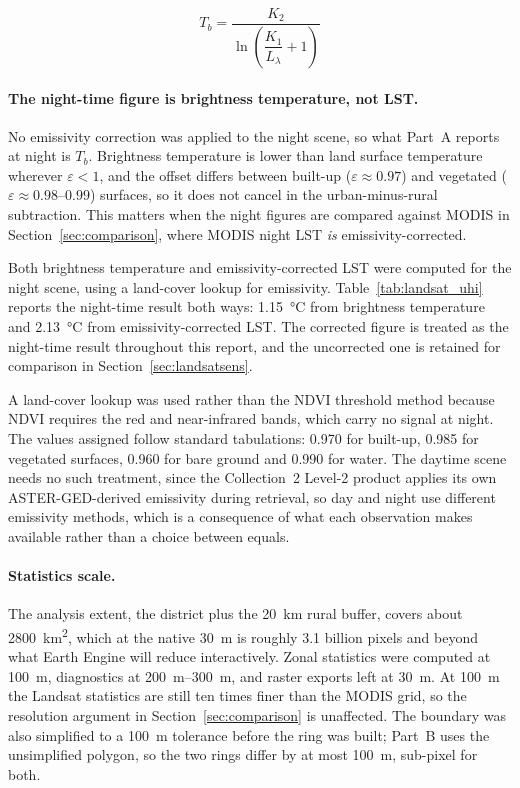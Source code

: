 \documentclass[11pt,a4paper]{article}
\begin{document}
\begin{equation}
  T_b = \frac{K_2}{\ln\!\left(\dfrac{K_1}{L_\lambda} + 1\right)}
\end{equation}

\paragraph{The night-time figure is brightness temperature, not LST.}
No emissivity correction was applied to the night scene, so what
Part~A reports at night is $T_b$. Brightness temperature is lower than
land surface temperature wherever $\varepsilon < 1$, and the offset
differs between built-up ($\varepsilon \approx 0.97$) and vegetated
($\varepsilon \approx 0.98$--$0.99$) surfaces, so it does not cancel
in the urban-minus-rural subtraction. This matters when the night
figures are compared against MODIS in Section~\ref{sec:comparison},
where MODIS night LST \emph{is} emissivity-corrected.

Both brightness temperature and emissivity-corrected LST were
computed for the night scene, using a land-cover lookup for
emissivity. Table~\ref{tab:landsat_uhi} reports the night-time result
both ways: \SI{1.15}{\degreeCelsius} from brightness temperature and
\SI{2.13}{\degreeCelsius} from emissivity-corrected LST. The corrected
figure is treated as the night-time result throughout this report, and
the uncorrected one is retained for comparison in
Section~\ref{sec:landsatsens}.

A land-cover lookup was used rather than the NDVI threshold method
because NDVI requires the red and near-infrared bands, which carry no
signal at night. The values assigned follow standard tabulations:
\num{0.970} for built-up, \num{0.985} for vegetated surfaces,
\num{0.960} for bare ground and \num{0.990} for water. The daytime
scene needs no such treatment, since the Collection~2 Level-2 product
applies its own ASTER-GED-derived emissivity during retrieval, so
day and night use different emissivity methods, which is a
consequence of what each observation makes available rather than a
choice between equals.

\paragraph{Statistics scale.}
\label{sec:landsat_scale}

The analysis extent, the district plus the \SI{20}{\kilo\metre}
rural buffer, covers about \SI{2800}{\kilo\metre\squared}, which at
the native \SI{30}{\metre} is roughly \num{3.1} billion pixels and
beyond what Earth Engine will reduce interactively. Zonal statistics
were computed at \SI{100}{\metre}, diagnostics at
\SIrange{200}{300}{\metre}, and raster exports left at
\SI{30}{\metre}. At \SI{100}{\metre} the Landsat statistics are still
ten times finer than the MODIS grid, so the resolution argument in
Section~\ref{sec:comparison} is unaffected. The boundary was also
simplified to a \SI{100}{\metre} tolerance before the ring was built;
Part~B uses the unsimplified polygon, so the two rings differ by at
most \SI{100}{\metre}, sub-pixel for both.
\end{document}
